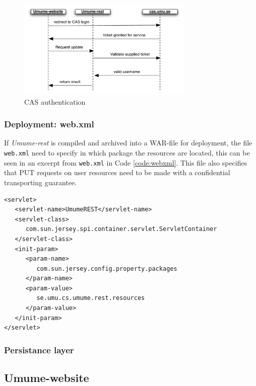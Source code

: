 \documentclass[titlepage, twocolumn, a4paper, 10pt]{article}
\begin{document}
\begin{figure}[!thb]
  \centering
  \includegraphics[width=3.3in]{images/auth.pdf}
  \caption{CAS authentication}
  \label{fig:images/auth}
\end{figure}

\subsubsection{Deployment: web.xml}
If \textit{Umume-rest} is compiled and archived into a WAR-file for deployment, the file \texttt{web.xml} need to specify in which package the resources are located, this can be seen in an excerpt from \texttt{web.xml} in Code \ref{code:webxml}. This file also specifies that PUT requests on user resources need to be made with a confidential transporting guarantee.

\begin{code}
  \begin{footnotesize}
\begin{verbatim}
<servlet>
   <servlet-name>UmumeREST</servlet-name>
   <servlet-class>
      com.sun.jersey.spi.container.servlet.ServletContainer
   </servlet-class>
   <init-param>
      <param-name>
         com.sun.jersey.config.property.packages
      </param-name>
      <param-value>
         se.umu.cs.umume.rest.resources
      </param-value>
   </init-param>
</servlet>
\end{verbatim}
  \end{footnotesize}
  \caption{web.xml jersey resources}\label{code:webxml}
\end{code}

\subsubsection{Persistance layer}\label{sec:persistance}

\subsection{Umume-website}\label{sec:umume-website}
\end{document}
